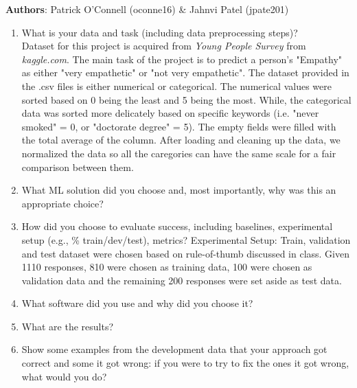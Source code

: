 \documentclass[8pt]{report}
\begin{document}
\textbf{Authors}: Patrick O'Connell (oconne16) \& Jahnvi Patel (jpate201)
\begin{enumerate}
\item What is your data and task (including data preprocessing steps)? \\
Dataset for this project is acquired from \textit{Young People Survey} from \textit{kaggle.com}. The main task of the project is to predict a person's "Empathy" as either "very empathetic" or "not very empathetic". The dataset provided in the .csv files is either numerical or categorical. The numerical values were sorted based on 0 being the least and 5 being the most. While, the categorical data was sorted more delicately based on specific keywords (i.e. "never smoked" = 0, or "doctorate degree" = 5). The empty fields were filled with the total average of the column. After loading and cleaning up the data, we normalized the data so all the caregories can have the same scale for a fair comparison between them. 

\item What ML solution did you choose and, most importantly, why was this an appropriate choice?
\item How did you choose to evaluate success, including baselines, experimental setup (e.g., \% train/dev/test), metrics?
Experimental Setup: Train, validation and test dataset were chosen based on rule-of-thumb discussed in class. Given 1110 responses, 810 were chosen as training data, 100 were chosen as validation data and the remaining 200 responses were set aside as test data. 


\item What software did you use and why did you choose it?
\item What are the results?
\item Show some examples from the development data that your approach got correct and some it got wrong: if you were to try to fix the ones it got wrong, what would you do?
\end{enumerate}
\end{document}
